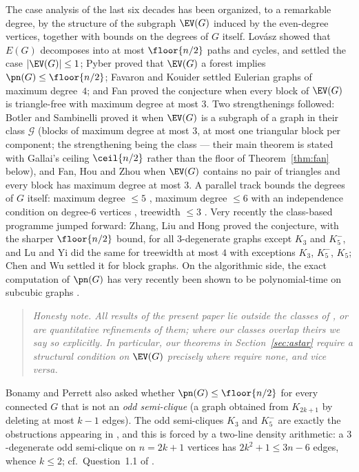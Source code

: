 The case analysis of the last six decades has been organized, to a remarkable degree, by the
structure of the subgraph $\EV(G)$ induced by the even-degree vertices, together with bounds on
the degrees of $G$ itself. Lov\'asz \cite{Lo68} showed that $E(G)$ decomposes into at most
$\floor{n/2}$ paths and cycles, and settled the case $|\EV(G)|\le 1$; Pyber \cite{Pyb96} proved
that $\EV(G)$ a forest implies $\pn(G)\le \floor{n/2}$; Favaron and Kouider \cite{FK88} settled
Eulerian graphs of maximum degree~$4$; and Fan \cite{Fan05} proved the conjecture when every
block of $\EV(G)$ is triangle-free with maximum degree at most $3$. Two strengthenings followed:
Botler and Sambinelli \cite{BS21} proved it when $\EV(G)$ is a subgraph of a graph in their
class $\mathcal{G}$ (blocks of maximum degree at most $3$, at most one triangular block per
component; the strengthening being the class --- their main theorem is stated with Gallai's
ceiling $\ceil{n/2}$ rather than the floor of Theorem~\ref{thm:fan} below), and Fan, Hou and
Zhou \cite{FHZ23} when $\EV(G)$ contains no pair of triangles and
every block has maximum degree at most $3$. A parallel track bounds the degrees of $G$ itself:
maximum degree $\le 5$ \cite{BP19}, maximum degree $\le 6$ with an independence condition on
degree-$6$ vertices \cite{CFL}, treewidth $\le 3$ \cite{BCLS20}. Very recently the
class-based programme jumped forward: Zhang, Liu and Hong \cite{ZLH24} proved the conjecture,
with the sharper $\floor{n/2}$ bound, for all $3$-degenerate graphs except $K_3$ and $K_5^-$,
and Lu and Yi \cite{LY24} did the same for treewidth at most $4$ with exceptions $K_3$, $K_5^-$,
$K_5$; Chen and Wu \cite{CW25} settled it for block graphs. On the algorithmic side, the exact
computation of $\pn(G)$ has very recently been shown to be polynomial-time on subcubic graphs
\cite{MY26}.

\begin{quote}\small\itshape
Honesty note. All results of the present paper lie outside the classes of
\cite{ZLH24,LY24,CW25}, or are quantitative refinements of them; where our classes overlap
theirs we say so explicitly. In particular, our theorems in Section~\ref{sec:astar} require a
structural condition on $\EV(G)$ precisely where \cite{ZLH24,LY24} require none, and vice versa.
\end{quote}

Bonamy and Perrett \cite{BP19} also asked whether $\pn(G)\le \floor{n/2}$ for every connected
$G$ that is not an \emph{odd semi-clique} (a graph obtained from $K_{2k+1}$ by deleting at most
$k-1$ edges). The odd semi-cliques $K_3$ and $K_5^-$ are exactly the obstructions appearing in
\cite{ZLH24,LY24}, and this is forced by a two-line density arithmetic: a $3$-degenerate odd
semi-clique on $n=2k+1$ vertices has $2k^2+1\le 3n-6$ edges, whence $k\le 2$; cf.\ Question~1.1
of \cite{BP19}.

